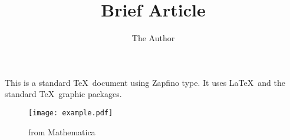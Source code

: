 \documentclass[12pt]{article}
\title{Brief Article}
\author{The Author}
\begin{document}
\maketitle

This is a standard \TeX\ document using Zapfino type. It uses \LaTeX\ and
the standard \TeX\ graphic packages.

\begin{figure}[htbp] 
   \centering
   \texttt{[image: example.pdf]} 
   \caption{from Mathematica}
\end{figure}
\end{document}
